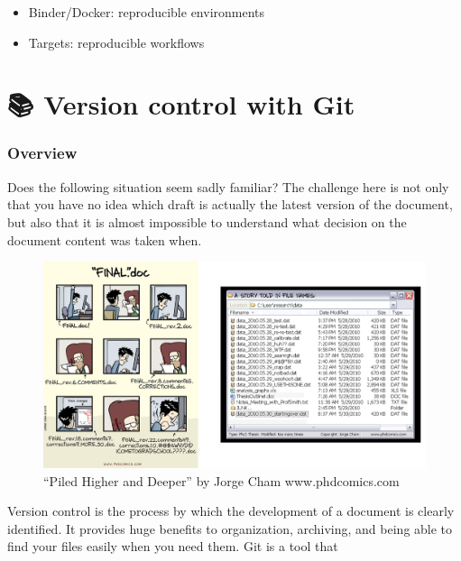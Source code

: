 \documentclass[
  letterpaper,
  DIV=11,
  numbers=noendperiod,
  oneside]{scrreprt}
\providecommand{\tightlist}{%
  \setlength{\itemsep}{0pt}\setlength{\parskip}{0pt}}\usepackage{longtable,booktabs,array}
\begin{document}
\begin{itemize}
\tightlist
\item
  Binder/Docker: reproducible environments
\item
  Targets: reproducible workflows
\end{itemize}

\hypertarget{version-control-with-git}{%
\chapter{\texorpdfstring{{📚} Version control with
Git}{📚 Version control with Git}}\label{version-control-with-git}}

\hypertarget{overview-1}{%
\subsection{Overview}\label{overview-1}}

Does the following situation seem sadly familiar? The challenge here is
not only that you have no idea which draft is actually the latest
version of the document, but also that it is almost impossible to
understand what decision on the document content was taken when.

\begin{figure}

{\centering \includegraphics{./images/paste-2840AEE3.png}

}

\caption{\label{fig-final-doc}``Piled Higher and Deeper'' by Jorge Cham
www.phdcomics.com}

\end{figure}

Version control is the process by which the development of a document is
clearly identified. It provides huge benefits to organization,
archiving, and being able to find your files easily when you need them.
Git is a tool that
\end{document}
